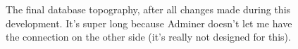 \documentclass{article}
\begin{document}
\begin{figure}[h!]
    \centering
    \caption{The final database topography, after all changes made during this development. It's super long because Adminer doesn't let me have the connection on the other side (it's really not designed for this).}
    \label{fig:finaldb}
\end{figure}
\end{document}

